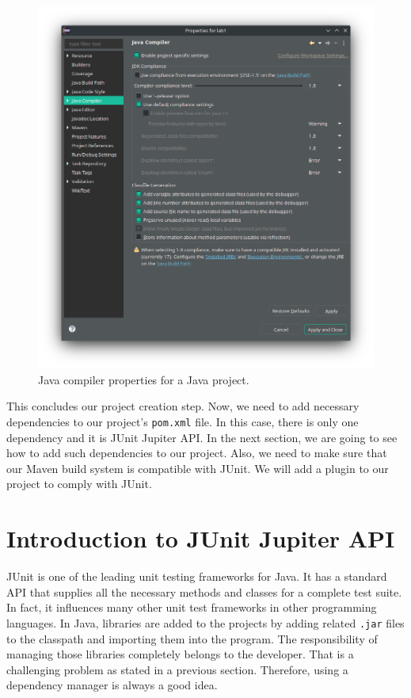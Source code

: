 \begin{figure}[H]
    \centering
    \includegraphics[width=\textwidth]{images/java-version.png}
    \caption{Java compiler properties for a Java project.}
    \label{fig:java-version}
\end{figure}

This concludes our project creation step. Now, we need to add necessary dependencies to our project's \lstinline[language={}]|pom.xml| file. In this case, there is only one dependency and it is JUnit Jupiter API. In the next section, we are going to see how to add such dependencies to our project. Also, we need to make sure that our Maven build system is compatible with JUnit. We will add a plugin to our project to comply with JUnit.

\section{Introduction to JUnit Jupiter API}
JUnit is one of the leading unit testing frameworks for Java. It has a standard API that supplies all the necessary methods and classes for a complete test suite. In fact, it influences many other unit test frameworks in other programming languages. In Java, libraries are added to the projects by adding related \lstinline[language={}]|.jar| files to the classpath and importing them into the program. The responsibility of managing those libraries completely belongs to the developer. That is a challenging problem as stated in a previous section. Therefore, using a dependency manager is always a good idea.

